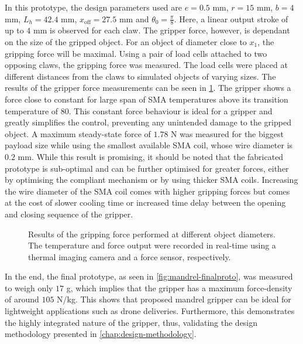 In this prototype, the design parameters used are $e=0.5$ mm, $r=15$ mm, $b=4$ mm, $L_h=42.4$ mm, $x_\text{off}=27.5$ mm and $\theta_0 = \frac{\pi}{8}$. Here, a linear output stroke of up to $4$ mm is observed for each claw. The gripper force, however, is dependant on the size of the gripped object. For an object of diameter close to $x_1$, the gripping force will be maximal. Using a pair of load cells attached to two opposing claws, the gripping force was measured. The load cells were placed at different distances from the claws to simulated objects of varying sizes. The results of the gripper force measurements can be seen in \cref{fig:mandrel-force-temp}. The gripper shows a force close to constant for large span of SMA temperatures above its transition temperature of 80\degreeC. This constant force behaviour is ideal for a gripper and greatly simplifies the control, preventing any unintended damage to the gripped object. A maximum steady-state force of $1.78$ N was measured for the biggest payload size while using the smallest available SMA coil, whose wire diameter is $0.2$ mm. While this result is promising, it should be noted that the fabricated prototype is sub-optimal and can be further optimised for greater forces, either by optimising the compliant mechanism or by using thicker SMA coils. Increasing the wire diameter of the SMA coil comes with higher gripping forces but comes at the cost of slower cooling time or increased time delay between the opening and closing sequence of the gripper.
\begin{figure}[hbt!] %
  \centering
  \resizebox{0.7\textwidth}{!}{}
  \caption{Results of the gripping force performed at different object diameters. The temperature and force output were recorded in real-time using a thermal imaging camera and a force sensor, respectively.}
  \label{fig:mandrel-force-temp}
\end{figure}

In the end, the final prototype, as seen in \cref{fig:mandrel-finalproto}, was measured to weigh only $17$ g, which implies that the gripper has a maximum force-density of around $105$ N/kg. This shows that proposed mandrel gripper can be ideal for lightweight applications such as drone deliveries. Furthermore, this demonstrates the highly integrated nature of the gripper, thus, validating the design methodology presented in \cref{chap:design-methodology}.
